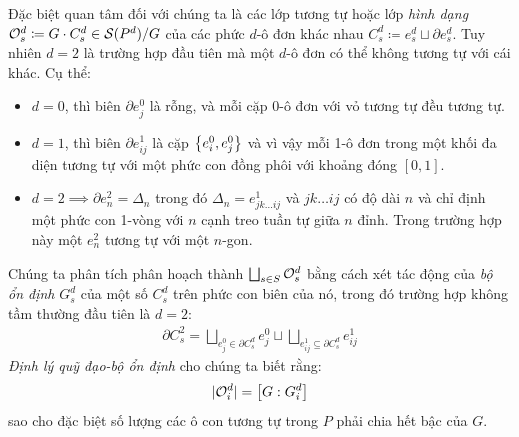 \documentclass{article}
\theoremstyle{plain}
\theoremstyle{definition}
\begin{document}
 Đặc biệt quan tâm đối với chúng ta là các lớp tương tự hoặc lớp \emph{hình dạng} $\mathcal{O}^d_s\coloneqq G\cdot C^d_s\in \mathcal{S}(P^d)/G$ của các phức $d$-ô đơn khác nhau $C^d_s\coloneqq e^d_s\sqcup \partial e^d_s$. 
 Tuy nhiên $d=2$ là trường hợp đầu tiên mà một $d$-ô đơn có thể không tương tự với cái khác. Cụ thể: 
 \begin{itemize}
     \item $d=0$, thì biên $\partial e^0_j$ là rỗng, và mỗi cặp 0-ô đơn với vỏ tương tự đều tương tự.
     \item $d=1$, thì biên $\partial e^1_{ij}$ là cặp $\left\{e^0_i, e^0_j\right\}$ và vì vậy mỗi 1-ô đơn trong một khối đa diện tương tự với một phức con đồng phôi với khoảng đóng $[0,1]$. 
     \item $d=2\implies \partial e^2_n=\Delta_n$ trong đó $\Delta_n=e^1_{jk\dots ij}$ và $jk\dots ij$ có độ dài $n$ và chỉ định một phức con 1-vòng với $n$ cạnh treo tuần tự giữa $n$ đỉnh.  Trong trường hợp này một $e^2_n$ tương tự với một $n$-gon.
 \end{itemize}
 
 
Chúng ta phân tích phân hoạch thành $\bigsqcup_{s\in S}\mathcal{O}^d_s$ bằng cách xét tác động của \emph{bộ ổn định} $G^d_s$ của một số $C^d_s$ trên phức con biên của nó, trong đó trường hợp không tầm thường đầu tiên là $d=2$: 
\begin{align}
    \partial C^2_s=\bigsqcup_{e^0_j\in \partial C^d_s}e^0_j\sqcup\bigsqcup_{e^1_{ij}\subseteq\partial C^d_s}e^1_{ij}
\end{align}
\emph{Định lý quỹ đạo-bộ ổn định} \cite{dummitfoote} cho chúng ta biết rằng: 
\begin{equation}
    |\mathcal{O}^d_i|=\left[G: G^d_i\right]
\end{equation}
sao cho đặc biệt số lượng các ô con tương tự trong $P$ phải chia hết bậc của $G$. 
 
\end{document}
